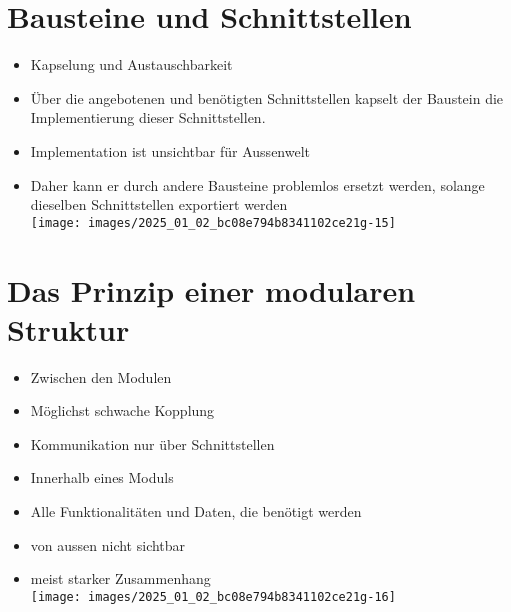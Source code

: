 \documentclass[10pt]{article}
\begin{document}
\section*{Bausteine und Schnittstellen}
\begin{itemize}
  \item Kapselung und Austauschbarkeit
  \item Über die angebotenen und benötigten Schnittstellen kapselt der Baustein die Implementierung dieser Schnittstellen.
  \item Implementation ist unsichtbar für Aussenwelt
  \item Daher kann er durch andere Bausteine problemlos ersetzt werden, solange dieselben Schnittstellen exportiert werden\\
\texttt{[image: images/2025\_01\_02\_bc08e794b8341102ce21g-15]}
\end{itemize}

\section*{Das Prinzip einer modularen Struktur}
\begin{itemize}
  \item Zwischen den Modulen
  \item Möglichst schwache Kopplung
  \item Kommunikation nur über Schnittstellen
  \item Innerhalb eines Moduls
  \item Alle Funktionalitäten und Daten, die benötigt werden
  \item von aussen nicht sichtbar
  \item meist starker Zusammenhang\\
\texttt{[image: images/2025\_01\_02\_bc08e794b8341102ce21g-16]}
\end{itemize}
\end{document}
